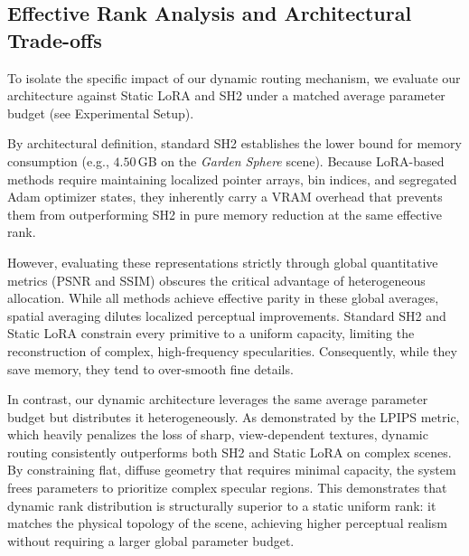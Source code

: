 \documentclass[sigconf]{acmart}
\begin{document}



\subsection{Effective Rank Analysis and Architectural Trade-offs}
To isolate the specific impact of our dynamic routing mechanism, we evaluate 
our architecture against Static LoRA and SH2 under a matched average parameter 
budget (see Experimental Setup).

By architectural definition, standard SH2 establishes the lower bound for 
memory consumption (e.g., $4.50$\,GB on the \textit{Garden Sphere} scene). 
Because LoRA-based methods require maintaining localized pointer arrays, 
bin indices, and segregated Adam optimizer states, they inherently carry a 
VRAM overhead that prevents them from outperforming SH2 in pure memory 
reduction at the same effective rank. 

However, evaluating these representations strictly through global quantitative 
metrics (PSNR and SSIM) obscures the critical advantage of heterogeneous 
allocation. While all methods achieve effective parity in these global averages, 
spatial averaging dilutes localized perceptual improvements. Standard SH2 and 
Static LoRA constrain every primitive to a uniform capacity, limiting the 
reconstruction of complex, high-frequency specularities. Consequently, while 
they save memory, they tend to over-smooth fine details. 

In contrast, our dynamic architecture leverages the same average parameter 
budget but distributes it heterogeneously. As demonstrated by the LPIPS 
metric, which heavily penalizes the loss of sharp, view-dependent textures, 
dynamic routing consistently outperforms both SH2 and Static LoRA on complex 
scenes. By constraining flat, diffuse geometry that requires minimal capacity, 
the system frees parameters to prioritize complex specular regions. This 
demonstrates that dynamic rank distribution is structurally superior to a 
static uniform rank: it matches the physical topology of the scene, achieving 
higher perceptual realism without requiring a larger global parameter budget.
\end{document}
